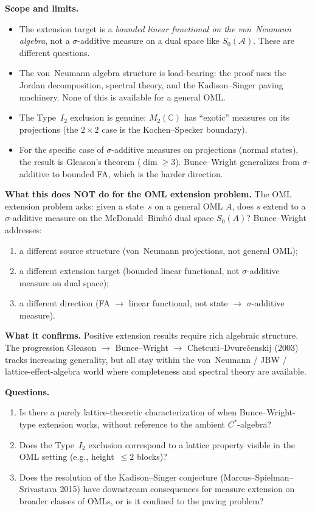 \textbf{Scope and limits.}
\begin{itemize}[nosep]
  \item The extension target is a \emph{bounded linear functional on
    the von~Neumann algebra}, not a $\sigma$-additive measure on a
    dual space like $S_0(\mathcal{A})$.  These are different questions.
  \item The von~Neumann algebra structure is load-bearing: the proof
    uses the Jordan decomposition, spectral theory, and the
    Kadison--Singer paving machinery.  None of this is available for
    a general OML.
  \item The Type~$I_2$ exclusion is genuine: $M_2(\mathbb{C})$ has
    ``exotic'' measures on its projections (the $2 \times 2$ case
    is the Kochen--Specker boundary).
  \item For the specific case of $\sigma$-additive measures on
    projections (normal states), the result is Gleason's theorem
    ($\dim \geq 3$).  Bunce--Wright generalizes from $\sigma$-additive
    to bounded FA, which is the harder direction.
\end{itemize}

\textbf{What this does NOT do for the OML extension problem.}
The OML extension problem asks: given a state~$s$ on a general OML
$A$, does $s$ extend to a $\sigma$-additive measure on the
McDonald--Bimb\'{o} dual space $S_0(A)$?  Bunce--Wright addresses:
\begin{enumerate}[nosep]
  \item a different source structure (von~Neumann projections, not
    general OML);
  \item a different extension target (bounded linear functional, not
    $\sigma$-additive measure on dual space);
  \item a different direction (FA $\to$ linear functional, not
    state $\to$ $\sigma$-additive measure).
\end{enumerate}

\textbf{What it confirms.}  Positive extension results require rich
algebraic structure.  The progression Gleason $\to$ Bunce--Wright $\to$
Chetcuti--Dvure\v{c}enskij (2003) tracks increasing generality, but
all stay within the von~Neumann / JBW / lattice-effect-algebra world
where completeness and spectral theory are available.

\textbf{Questions.}

\begin{enumerate}[nosep]
  \item Is there a purely lattice-theoretic characterization of when
    Bunce--Wright-type extension works, without reference to the
    ambient $C^*$-algebra?
  \item Does the Type~$I_2$ exclusion correspond to a lattice property
    visible in the OML setting (e.g., height~$\leq 2$ blocks)?
  \item Does the resolution of the Kadison--Singer conjecture
    (Marcus--Spielman--Srivastava 2015) have downstream consequences
    for measure extension on broader classes of OMLs, or is it
    confined to the paving problem?
\end{enumerate}

